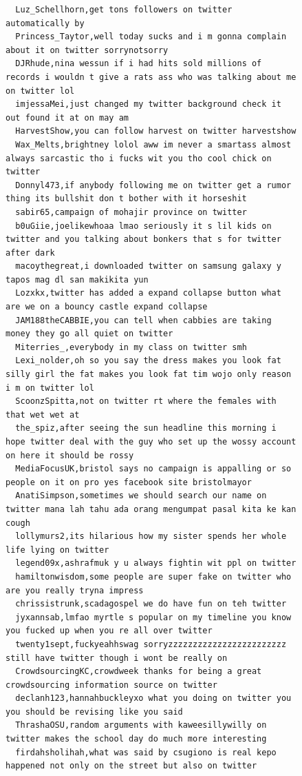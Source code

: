 \begin{figure}[htpb]
\begin{verbatim}
  Luz_Schellhorn,get tons followers on twitter automatically by
  Princess_Taytor,well today sucks and i m gonna complain about it on twitter sorrynotsorry
  DJRhude,nina wessun if i had hits sold millions of records i wouldn t give a rats ass who was talking about me on twitter lol
  imjessaMei,just changed my twitter background check it out found it at on may am
  HarvestShow,you can follow harvest on twitter harvestshow
  Wax_Melts,brightney lolol aww im never a smartass almost always sarcastic tho i fucks wit you tho cool chick on twitter
  Donnyl473,if anybody following me on twitter get a rumor thing its bullshit don t bother with it horseshit
  sabir65,campaign of mohajir province on twitter
  b0uGiie,joelikewhoaa lmao seriously it s lil kids on twitter and you talking about bonkers that s for twitter after dark
  macoythegreat,i downloaded twitter on samsung galaxy y tapos mag dl san makikita yun
  Lozxkx,twitter has added a expand collapse button what are we on a bouncy castle expand collapse
  JAM188theCABBIE,you can tell when cabbies are taking money they go all quiet on twitter
  Miterries_,everybody in my class on twitter smh
  Lexi_nolder,oh so you say the dress makes you look fat silly girl the fat makes you look fat tim wojo only reason i m on twitter lol
  ScoonzSpitta,not on twitter rt where the females with that wet wet at
  the_spiz,after seeing the sun headline this morning i hope twitter deal with the guy who set up the wossy account on here it should be rossy
  MediaFocusUK,bristol says no campaign is appalling or so people on it on pro yes facebook site bristolmayor
  AnatiSimpson,sometimes we should search our name on twitter mana lah tahu ada orang mengumpat pasal kita ke kan cough
  lollymurs2,its hilarious how my sister spends her whole life lying on twitter
  legend09x,ashrafmuk y u always fightin wit ppl on twitter
  hamiltonwisdom,some people are super fake on twitter who are you really tryna impress
  chrissistrunk,scadagospel we do have fun on teh twitter
  jyxannsab,lmfao myrtle s popular on my timeline you know you fucked up when you re all over twitter
  twenty1sept,fuckyeahhswag sorryzzzzzzzzzzzzzzzzzzzzzzzz still have twitter though i wont be really on
  CrowdsourcingKC,crowdweek thanks for being a great crowdsourcing information source on twitter
  declanh123,hannahbuckleyxo what you doing on twitter you you should be revising like you said
  ThrashaOSU,random arguments with kaweesillywilly on twitter makes the school day do much more interesting
  firdahsholihah,what was said by csugiono is real kepo happened not only on the street but also on twitter

\end{verbatim}
\end{figure}
